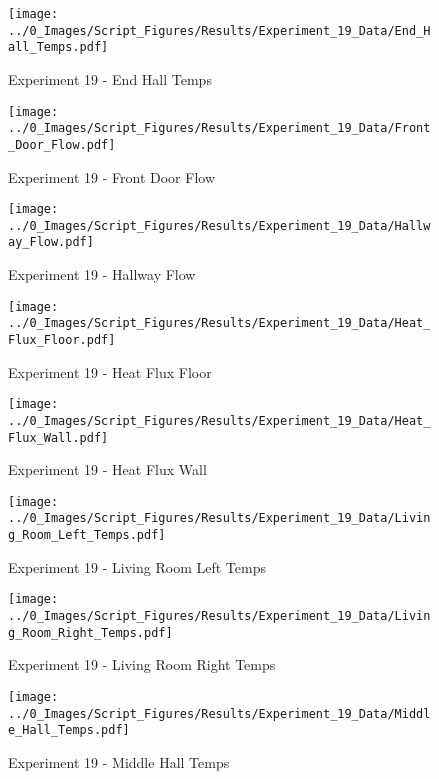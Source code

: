 	\begin{figure}[H]
		\centering
		\texttt{[image: ../0\_Images/Script\_Figures/Results/Experiment\_19\_Data/End\_Hall\_Temps.pdf]}
		\caption[]{Experiment 19 - End Hall Temps}
	\end{figure}
 
	\clearpage

	\begin{figure}[H]
		\centering
		\texttt{[image: ../0\_Images/Script\_Figures/Results/Experiment\_19\_Data/Front\_Door\_Flow.pdf]}
		\caption[]{Experiment 19 - Front Door Flow}
	\end{figure}
 

	\begin{figure}[H]
		\centering
		\texttt{[image: ../0\_Images/Script\_Figures/Results/Experiment\_19\_Data/Hallway\_Flow.pdf]}
		\caption[]{Experiment 19 - Hallway Flow}
	\end{figure}
 
	\clearpage

	\begin{figure}[H]
		\centering
		\texttt{[image: ../0\_Images/Script\_Figures/Results/Experiment\_19\_Data/Heat\_Flux\_Floor.pdf]}
		\caption[]{Experiment 19 - Heat Flux Floor}
	\end{figure}
 

	\begin{figure}[H]
		\centering
		\texttt{[image: ../0\_Images/Script\_Figures/Results/Experiment\_19\_Data/Heat\_Flux\_Wall.pdf]}
		\caption[]{Experiment 19 - Heat Flux Wall}
	\end{figure}
 
	\clearpage

	\begin{figure}[H]
		\centering
		\texttt{[image: ../0\_Images/Script\_Figures/Results/Experiment\_19\_Data/Living\_Room\_Left\_Temps.pdf]}
		\caption[]{Experiment 19 - Living Room Left Temps}
	\end{figure}
 

	\begin{figure}[H]
		\centering
		\texttt{[image: ../0\_Images/Script\_Figures/Results/Experiment\_19\_Data/Living\_Room\_Right\_Temps.pdf]}
		\caption[]{Experiment 19 - Living Room Right Temps}
	\end{figure}
 
	\clearpage

	\begin{figure}[H]
		\centering
		\texttt{[image: ../0\_Images/Script\_Figures/Results/Experiment\_19\_Data/Middle\_Hall\_Temps.pdf]}
		\caption[]{Experiment 19 - Middle Hall Temps}
	\end{figure}
 

